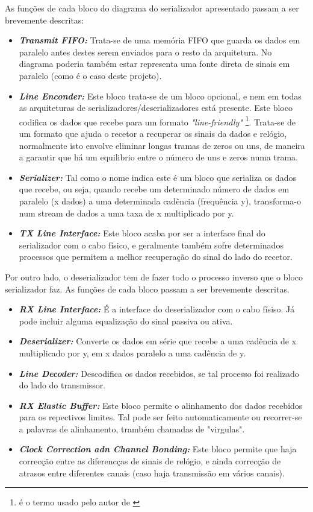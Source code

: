 As funções de cada bloco do diagrama do serializador apresentado passam a ser brevemente descritas:

\begin{itemize}
	\item \textbf{\textit{Transmit FIFO:}} Trata-se de uma memória FIFO que guarda os dados em paralelo antes destes serem enviados para o resto da arquitetura. No diagrama poderia também estar representa uma fonte direta de sinais em paralelo (como é o caso deste projeto).
	\item\textbf{\textit{Line Enconder:}} Este bloco trata-se de um  bloco opcional, e nem em todas as arquiteturas de serializadores/deserializadores está presente. Este bloco codifica os dados que recebe para um formato \textit{"line-friendly"} \footnote{é o termo usado pelo autor de \cite{R032}}. Trata-se de um formato que ajuda o recetor a recuperar os sinais da dados e relógio, normalmente isto envolve eliminar longas tramas de zeros ou uns, de maneira a garantir que há um equilibrio entre o número de uns e zeros numa trama.
	\item \textbf{\textit{Serializer:}} Tal como o nome indica este é um bloco que serializa os dados que recebe, ou seja, quando recebe um determinado número de dados em paralelo (x dados) a uma determinada cadência (frequência y), transforma-o num stream de dados a uma taxa de x multiplicado por y. 
	\item \textbf{\textit{TX Line Interface:}} Este bloco acaba por ser a interface final do serializador com o cabo físico, e geralmente também sofre determinados processos que permitem a melhor recuperação do sinal do lado do recetor.
\end{itemize}

Por outro lado, o deserializador tem de fazer todo o processo inverso que o bloco serializador faz. As funções de cada bloco passam a ser brevemente descritas.

\begin{itemize}
	\item \textbf{\textit{RX Line Interface:}} É a interface do deserializador com o cabo físiso. Já pode incluir alguma equalização do sinal passiva ou ativa.
	\item\textbf{\textit{Deserializer:}} Converte os dados em série que recebe a uma cadência de x multiplicado por y, em x dados paralelo a uma cadência de y.
	\item \textbf{\textit{Line Decoder:}} Descodifica os dados recebidos, se tal processo foi realizado do lado do transmissor.
	\item \textbf{\textit{RX Elastic Buffer:}} Este bloco permite o alinhamento dos dados recebidos para os repectivos limites. Tal pode ser feito automaticamente ou recorrer-se a palavras de alinhamento, trambém chamadas de "virgulas".
	\item \textbf{\textit{Clock Correction adn Channel Bonding:}} Este bloco permite que haja correcção entre as diferencças de sinais de relógio, e ainda correcção de atrasos entre diferentes canais (caso haja transmissão em vários canais). 
\end{itemize}

